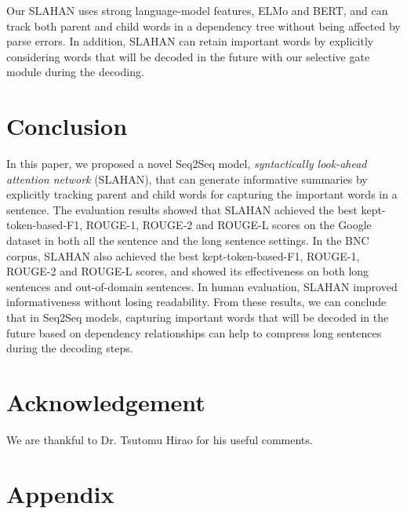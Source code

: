 \documentclass[letterpaper]{article} \usepackage{aaai20}  \usepackage{times}  \usepackage{helvet} \usepackage{courier}  \usepackage[hyphens]{url}  \usepackage{graphicx} \urlstyle{rm} \def\UrlFont{\rm}  \usepackage{graphicx}  \frenchspacing  \setlength{\pdfpagewidth}{8.5in}  \setlength{\pdfpageheight}{11in}  \usepackage{tabu}
\begin{document}
Our SLAHAN uses strong language-model features, ELMo and BERT, and can track both parent and child words in a dependency tree without being affected by parse errors.
In addition, SLAHAN can retain important words by explicitly considering words that will be decoded in the future with our selective gate module during the decoding.

\section{Conclusion}
In this paper, we proposed a novel Seq2Seq model, \textit{syntactically look-ahead attention network} (SLAHAN), that can generate informative summaries by explicitly tracking parent and child words for capturing the important words in a sentence. 
The evaluation results showed that SLAHAN achieved the best  kept-token-based-F1, ROUGE-1, ROUGE-2 and ROUGE-L scores on the Google dataset in both all the sentence and the long sentence settings.
In the BNC corpus, SLAHAN also achieved the best  kept-token-based-F1, ROUGE-1, ROUGE-2 and ROUGE-L scores, and showed its effectiveness on both long sentences and out-of-domain sentences.
In human evaluation, SLAHAN improved informativeness without losing readability.
From these results, we can conclude that in Seq2Seq models, capturing important words that will be decoded in the future based on dependency relationships can help to compress long sentences during the decoding steps.

\section{Acknowledgement}
We are thankful to Dr. Tsutomu Hirao for his useful comments.

\fontsize{9.0pt}{10.0pt} \selectfont



\appendix
\section*{Appendix}
\end{document}
